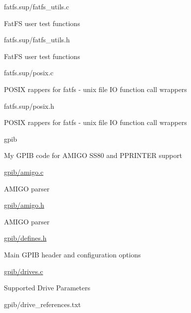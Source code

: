 \begin{DoxyItemize}
\begin{DoxyItemize}
\begin{DoxyItemize}
\end{DoxyItemize}
\item fatfs.\+sup/fatfs\+\_\+utils.c
\begin{DoxyItemize}
\item Fat\+FS user test functions
\end{DoxyItemize}
\item fatfs.\+sup/fatfs\+\_\+utils.h
\begin{DoxyItemize}
\item Fat\+FS user test functions
\end{DoxyItemize}
\item fatfs.\+sup/posix.c
\begin{DoxyItemize}
\item P\+O\+S\+IX rappers for fatfs -\/ unix file IO function call wrappers
\end{DoxyItemize}
\item fatfs.\+sup/posix.h
\begin{DoxyItemize}
\item P\+O\+S\+IX rappers for fatfs -\/ unix file IO function call wrappers
\end{DoxyItemize}
\end{DoxyItemize}
\item gpib
\begin{DoxyItemize}
\item My G\+P\+IB code for A\+M\+I\+GO S\+S80 and P\+P\+R\+I\+N\+T\+ER support
\item \hyperlink{amigo_8c}{gpib/amigo.\+c}
\begin{DoxyItemize}
\item A\+M\+I\+GO parser
\end{DoxyItemize}
\item \hyperlink{amigo_8h}{gpib/amigo.\+h}
\begin{DoxyItemize}
\item A\+M\+I\+GO parser
\end{DoxyItemize}
\item \hyperlink{defines_8h}{gpib/defines.\+h}
\begin{DoxyItemize}
\item Main G\+P\+IB header and configuration options
\end{DoxyItemize}
\item \hyperlink{drives_8c}{gpib/drives.\+c}
\begin{DoxyItemize}
\item Supported Drive Parameters
\end{DoxyItemize}
\item gpib/drive\+\_\+references.\+txt

\end{DoxyItemize}
\end{DoxyItemize}
